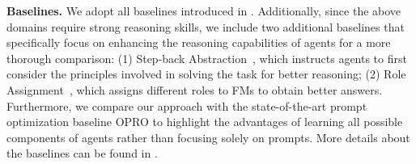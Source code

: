 \documentclass{article}
\begin{document}
\noindent\textbf{Baselines.}\hspace{0.5em} We adopt all baselines introduced in .
Additionally, since the above domains require strong reasoning skills, we include two additional baselines that specifically focus on enhancing the reasoning capabilities of agents for a more thorough comparison: (1) Step-back Abstraction~\citep{zheng2023stepback}, which instructs agents to first consider the principles involved in solving the task for better reasoning; (2) Role Assignment~\citep{xu2023expertprompting}, which assigns different roles to FMs to obtain better answers. Furthermore, we compare our approach with the state-of-the-art prompt optimization baseline OPRO \citep{yang2024OPRO} to highlight the advantages of learning all possible components of agents rather than focusing solely on prompts. More details about the baselines can be found in .
\end{document}
